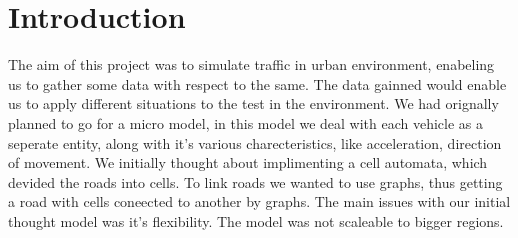 \section{Introduction}
The aim of this project was to simulate traffic in urban environment, enabeling us to gather some data with respect to the same. The data gainned would enable us to apply different situations to the test in the environment. We had orignally planned to go for a micro model, in this model we deal with each vehicle as a seperate entity, along with it's various charecteristics, like acceleration, direction of movement. We initially thought about implimenting a cell automata, which devided the roads into cells. To link roads we wanted to use graphs, thus getting a road with cells coneected to another by graphs. The main issues with our initial thought model was it's flexibility. The model was not scaleable to bigger regions.
